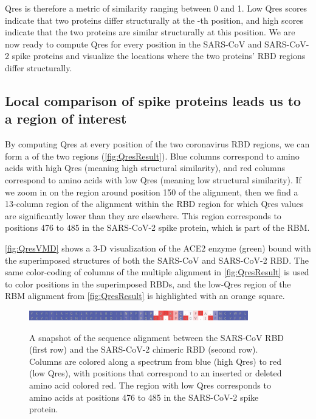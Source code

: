 Qres is therefore a metric of similarity ranging between 0 and 1. Low Qres scores indicate that two proteins differ structurally at the -th position, and high scores indicate that the two proteins are similar structurally at this position. We are now ready to compute Qres for every position in the SARS-CoV and SARS-CoV-2 spike proteins and visualize the locations where the two proteins' RBD regions differ structurally.

\FloatBarrier
{}
\subsection{Local comparison of spike proteins leads us to a region of interest}

By computing Qres at every position of the two coronavirus RBD regions, we can form a  of the two regions (\autoref{fig:QresResult}). Blue columns correspond to amino acids with high Qres (meaning high structural similarity), and red columns correspond to amino acids with low Qres (meaning low structural similarity). If we zoom in on the region around position 150 of the alignment, then we find a 13-column region of the alignment within the RBD region for which Qres values are significantly lower than they are elsewhere. This region corresponds to positions 476 to 485 in the SARS-CoV-2 spike protein, which is part of the RBM.

\autoref{fig:QresVMD} shows a 3-D visualization of the ACE2 enzyme (green) bound with the superimposed structures of both the SARS-CoV and SARS-CoV-2 RBD. The same color-coding of columns of the multiple alignment in \autoref{fig:QresResult} is used to color positions in the superimposed RBDs, and the low-Qres region of the RBM alignment  from \autoref{fig:QresResult} is highlighted with an orange square.\\

\begin{figure}[h]
	\centering
	\mySfFamily
		\includegraphics[width = 0.85\textwidth]{../images_CMYK/QresResult_trimmed} \\
	\caption{A snapshot of the sequence alignment between the SARS-CoV RBD (first row) and the SARS-CoV-2 chimeric RBD (second row). Columns are colored along a spectrum from blue (high Qres) to red (low Qres), with positions that correspond to an inserted or deleted amino acid colored red. The region with low Qres corresponds to amino acids at positions 476 to 485 in the SARS-CoV-2 spike protein.}
	\label{fig:QresResult}
\end{figure}


